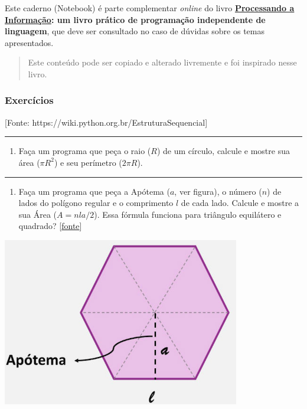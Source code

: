 \documentclass[12pt,a4paper]{article}
\providecommand{\tightlist}{%
      \setlength{\itemsep}{0pt}\setlength{\parskip}{0pt}}
\begin{document}
Este caderno (Notebook) é parte complementar \emph{online} do livro
\textbf{\href{https://editora.ufabc.edu.br/matematica-e-ciencias-da-computacao/58-processando-a-informacao}{Processando
a Informação}: um livro prático de programação independente de
linguagem}, que deve ser consultado no caso de dúvidas sobre os temas
apresentados.

\begin{quote}
Este conteúdo pode ser copiado e alterado livremente e foi inspirado
nesse livro.
\end{quote}

    \hypertarget{exercuxedcios}{%
\subsubsection{Exercícios}\label{exercuxedcios}}

{[}Fonte: https://wiki.python.org.br/EstruturaSequencial{]}

    \begin{center}\rule{0.5\linewidth}{0.5pt}\end{center}

\begin{enumerate}
\def\labelenumi{\arabic{enumi}.}
\tightlist
\item
  Faça um programa que peça o raio (\(R\)) de um círculo, calcule e
  mostre sua área (\(\pi R^2\)) e seu perímetro (\(2\pi R\)).
\end{enumerate}

    \begin{center}\rule{0.5\linewidth}{0.5pt}\end{center}

\begin{enumerate}
\def\labelenumi{\arabic{enumi}.}
\setcounter{enumi}{1}
\tightlist
\item
  Faça um programa que peça a Apótema (\(a\), ver figura), o número
  (\(n\)) de lados do polígono regular e o comprimento \(l\) de cada
  lado. Calcule e mostre a sua Área (\(A=nla/2\)). Essa fórmula funciona
  para triângulo equilátero e quadrado?
  {[}\href{https://www.todamateria.com.br/area-dos-poligonos/amp/}{fonte}{]}
\end{enumerate}

\includegraphics{"figs/poligono.png"}
\end{document}
